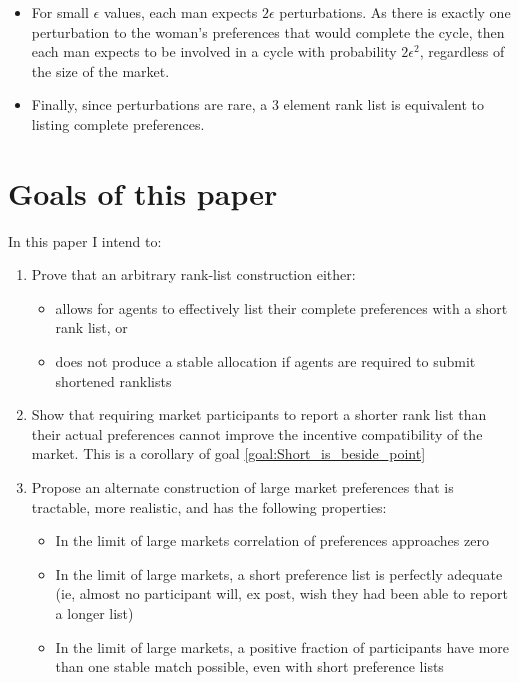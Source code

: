 \documentclass[WP]{AEA}
\begin{document}
\begin{itemize}
	\item  For small $\epsilon$ values, each man expects $2\epsilon$ perturbations.  As there is exactly one perturbation to the woman's preferences that would complete the cycle, then each man expects to be involved in a cycle  with probability $2 \epsilon^2$, regardless of the size of the market.
	
	\item Finally, since perturbations are rare, a 3 element rank list is equivalent to listing complete preferences.
\end{itemize}




\section{Goals of this paper}
In this paper I intend to:
\begin{enumerate}
	\item \label{goal:Short_is_beside_point} Prove that an arbitrary rank-list construction either:
	\begin{itemize}
		\item allows for agents to effectively list their complete preferences with a short rank list, or
		\item does not produce a stable allocation if agents are required to submit shortened ranklists
		
	\end{itemize}
	\item Show that requiring market participants to report a shorter rank list than their actual preferences cannot improve the incentive compatibility of the market.  This is a corollary of goal \ref*{goal:Short_is_beside_point}
	
	\item \label{goal:alternate_pref} Propose an alternate construction of large market preferences that is tractable, more realistic, and has the following properties:
	\begin{itemize}
		\item In the limit of large markets correlation of preferences approaches zero
		\item In the limit of large markets, a short preference list is perfectly adequate (ie, almost no participant will, ex post, wish they had been able to report a longer list)
		\item In the limit of large markets, a positive fraction of participants have more than one stable match possible, even with short preference lists
	\end{itemize}


\end{enumerate}
\end{document}
